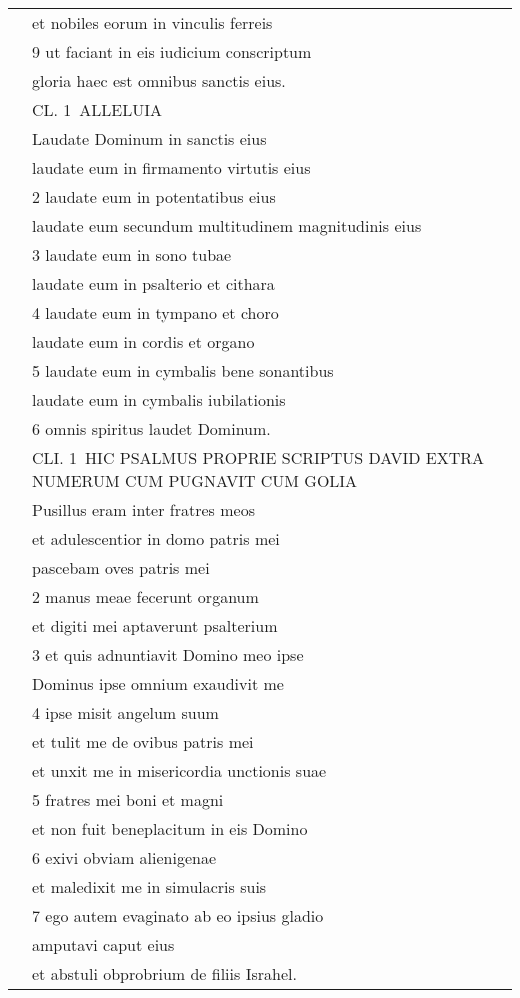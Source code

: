 \documentclass{article}
\begin{document}
\begin{longtable}{@{}p{}p{}p{}@{}}
	&	et nobiles eorum in vinculis ferreis	&		\\
	&	9 ut faciant in eis iudicium conscriptum	&		\\
	&	gloria haec est omnibus sanctis eius.	&		\\
	&	CL. 1 ALLELUIA	&		\\
	&	Laudate Dominum in sanctis eius	&		\\
	&	laudate eum in firmamento virtutis eius	&		\\
	&	2 laudate eum in potentatibus eius	&		\\
	&	laudate eum secundum multitudinem magnitudinis eius	&		\\
	&	3 laudate eum in sono tubae	&		\\
	&	laudate eum in psalterio et cithara	&		\\
	&	4 laudate eum in tympano et choro	&		\\
	&	laudate eum in cordis et organo	&		\\
	&	5 laudate eum in cymbalis bene sonantibus	&		\\
	&	laudate eum in cymbalis iubilationis	&		\\
	&	6 omnis spiritus laudet Dominum.	&		\\
	&	CLI. 1 HIC PSALMUS PROPRIE SCRIPTUS DAVID EXTRA NUMERUM CUM PUGNAVIT CUM GOLIA	&		\\
	&	Pusillus eram inter fratres meos	&		\\
	&	et adulescentior in domo patris mei	&		\\
	&	pascebam oves patris mei	&		\\
	&	2 manus meae fecerunt organum	&		\\
	&	et digiti mei aptaverunt psalterium	&		\\
	&	3 et quis adnuntiavit Domino meo ipse	&		\\
	&	Dominus ipse omnium exaudivit me	&		\\
	&	4 ipse misit angelum suum	&		\\
	&	et tulit me de ovibus patris mei	&		\\
	&	et unxit me in misericordia unctionis suae	&		\\
	&	5 fratres mei boni et magni	&		\\
	&	et non fuit beneplacitum in eis Domino	&		\\
	&	6 exivi obviam alienigenae	&		\\
	&	et maledixit me in simulacris suis	&		\\
	&	7 ego autem evaginato ab eo ipsius gladio	&		\\
	&	amputavi caput eius	&		\\
	&	et abstuli obprobrium de filiis Israhel.	&		\\
					
					
\end{longtable}					
\end{document}
